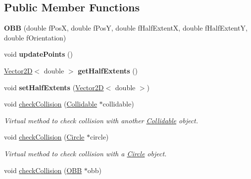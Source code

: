 \subsection*{Public Member Functions}
\begin{DoxyCompactItemize}
\item 
\hypertarget{class_o_b_b_a096b260dc12798e724dd9b2f670127f3}{}{\bfseries O\+B\+B} (double f\+Pos\+X, double f\+Pos\+Y, double f\+Half\+Extent\+X, double f\+Half\+Extent\+Y, double f\+Orientation)\label{class_o_b_b_a096b260dc12798e724dd9b2f670127f3}

\item 
\hypertarget{class_o_b_b_a3103d775e6ba4b27a80263ea14826309}{}void {\bfseries update\+Points} ()\label{class_o_b_b_a3103d775e6ba4b27a80263ea14826309}

\item 
\hypertarget{class_o_b_b_acb95cc5ca2f703da43444f6a029d117b}{}\hyperlink{class_vector2_d}{Vector2\+D}$<$ double $>$ {\bfseries get\+Half\+Extents} ()\label{class_o_b_b_acb95cc5ca2f703da43444f6a029d117b}

\item 
\hypertarget{class_o_b_b_a9008e3da97b4e62e47aba521e3a53b61}{}void {\bfseries set\+Half\+Extents} (\hyperlink{class_vector2_d}{Vector2\+D}$<$ double $>$)\label{class_o_b_b_a9008e3da97b4e62e47aba521e3a53b61}

\item 
\hypertarget{class_o_b_b_a2064e40dc401e8c04e3daad5c5aa62d2}{}void \hyperlink{class_o_b_b_a2064e40dc401e8c04e3daad5c5aa62d2}{check\+Collision} (\hyperlink{class_collidable}{Collidable} $\ast$collidable)\label{class_o_b_b_a2064e40dc401e8c04e3daad5c5aa62d2}

\begin{DoxyCompactList}\small\item\em Virtual method to check collision with another \hyperlink{class_collidable}{Collidable} object. \end{DoxyCompactList}\item 
\hypertarget{class_o_b_b_ab55aa6044004c4ea4e5d8310727569c0}{}void \hyperlink{class_o_b_b_ab55aa6044004c4ea4e5d8310727569c0}{check\+Collision} (\hyperlink{class_circle}{Circle} $\ast$circle)\label{class_o_b_b_ab55aa6044004c4ea4e5d8310727569c0}

\begin{DoxyCompactList}\small\item\em Virtual method to check collision with a \hyperlink{class_circle}{Circle} object. \end{DoxyCompactList}\item 
\hypertarget{class_o_b_b_afe394e34d273c0c7b1dfa9a6e28f059f}{}void \hyperlink{class_o_b_b_afe394e34d273c0c7b1dfa9a6e28f059f}{check\+Collision} (\hyperlink{class_o_b_b}{O\+B\+B} $\ast$obb)\label{class_o_b_b_afe394e34d273c0c7b1dfa9a6e28f059f}


\end{DoxyCompactItemize}
